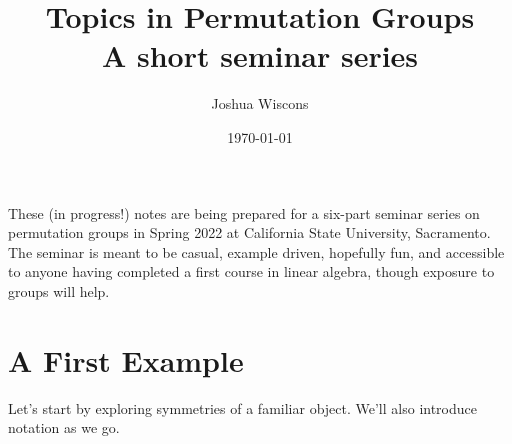 \documentclass[11pt]{amsart}
\theoremstyle{plain}
\theoremstyle{definition}
\theoremstyle{remark}
\begin{document}
\title[Permutation Groups]{Topics in Permutation Groups\\[7pt] {\footnotesize A short seminar series}}
\author{Joshua Wiscons}
\address{Department of Mathematics and Statistics\\
California State University, Sacramento\\
Sacramento, CA 95819, USA}
\date{\today}

\maketitle

\tableofcontents

These (in progress!) notes are being prepared for a six-part seminar series on permutation groups in Spring 2022 at California State University, Sacramento. The seminar is meant to be casual, example driven, hopefully fun, and accessible to anyone having completed a first course in linear algebra, though exposure to groups will help. 

\newpage
\section{A First Example}\label{S:first.example}
Let's start by exploring symmetries of a familiar object. We'll also introduce notation as we go.
\end{document}
